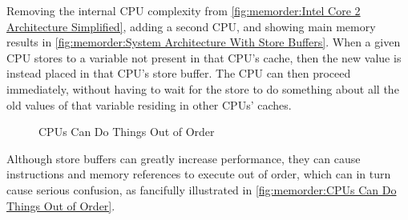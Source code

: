 Removing the internal CPU complexity from
\cref{fig:memorder:Intel Core 2 Architecture Simplified},
adding a second CPU, and showing main memory results in
\cref{fig:memorder:System Architecture With Store Buffers}.
When a given CPU stores to a variable
not present in that CPU's cache, then the new value
is instead placed in that CPU's store buffer.
The CPU can then proceed immediately, without having to wait for the
store to do something about all the old values of that variable
residing in other CPUs' caches.

\begin{figure}
\centering
{}
\caption{CPUs Can Do Things Out of Order}
\end{figure}

Although store buffers can greatly increase performance, they can cause
instructions and memory references to execute out of order, which can
in turn cause serious confusion, as fancifully illustrated in
\cref{fig:memorder:CPUs Can Do Things Out of Order}.

\begin{table}
\renewcommand*{\arraystretch}{1.1}
\small
\centering\OneColumnHSpace{-0.1in}
\caption{Memory Misordering:
			     Store-Buffering Sequence of Events}
\label{tab:memorder:Memory Misordering: Store-Buffering Sequence of Events}
\end{table}

